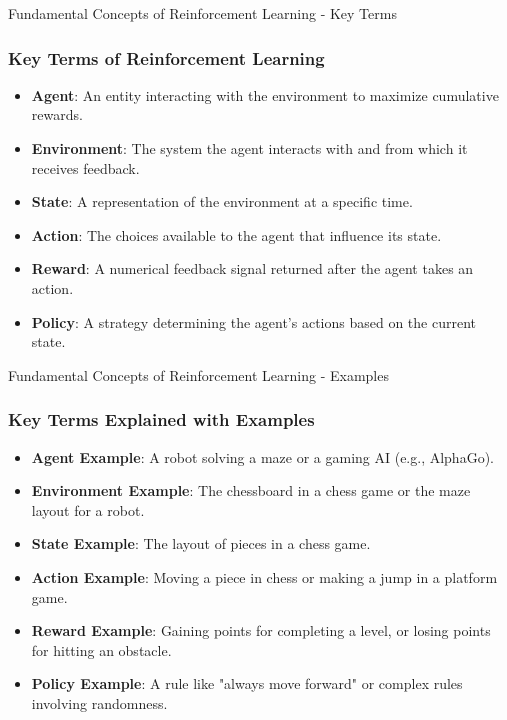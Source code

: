 \documentclass[aspectratio=169]{beamer}
\begin{document}
\begin{frame}[fragile]{Fundamental Concepts of Reinforcement Learning - Key Terms}
    \frametitle{Key Terms of Reinforcement Learning}
    \begin{itemize}
        \item \textbf{Agent}: An entity interacting with the environment to maximize cumulative rewards.
        \item \textbf{Environment}: The system the agent interacts with and from which it receives feedback.
        \item \textbf{State}: A representation of the environment at a specific time.
        \item \textbf{Action}: The choices available to the agent that influence its state.
        \item \textbf{Reward}: A numerical feedback signal returned after the agent takes an action.
        \item \textbf{Policy}: A strategy determining the agent's actions based on the current state.
    \end{itemize}
\end{frame}

\begin{frame}[fragile]{Fundamental Concepts of Reinforcement Learning - Examples}
    \frametitle{Key Terms Explained with Examples}
    \begin{itemize}
        \item \textbf{Agent Example}: A robot solving a maze or a gaming AI (e.g., AlphaGo).
        \item \textbf{Environment Example}: The chessboard in a chess game or the maze layout for a robot.
        \item \textbf{State Example}: The layout of pieces in a chess game.
        \item \textbf{Action Example}: Moving a piece in chess or making a jump in a platform game.
        \item \textbf{Reward Example}: Gaining points for completing a level, or losing points for hitting an obstacle.
        \item \textbf{Policy Example}: A rule like "always move forward" or complex rules involving randomness.
    \end{itemize}
\end{frame}
\end{document}
